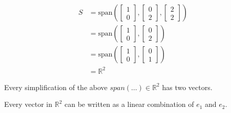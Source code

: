 \documentclass[12pt]{article}
\begin{document}
\begin{align}
  S &=
  \text{span}(
  \begin{bmatrix}
    1 \\0
  \end{bmatrix},
  \begin{bmatrix}
    0 \\ 2
  \end{bmatrix},
  \begin{bmatrix}
    2 \\2
  \end{bmatrix}
  )\\ &= \text{span}(
    \begin{bmatrix}
      1 \\0
    \end{bmatrix},
    \begin{bmatrix}
      0 \\ 2
    \end{bmatrix}
    )\\
    &= \text{span}(
    \begin{bmatrix}
      1 \\ 0
    \end{bmatrix},
    \begin{bmatrix}
      0 \\ 1
    \end{bmatrix}
    )\\
    &= \mathbb{R}^2
\end{align}

Every simplification of the above $span(\dots) \in \mathbb{R}^2$ has two vectors.

Every vector in $\mathbb{R}^2$ can be written as a linear combination of $e_1$ and $e_2$.
\end{document}

